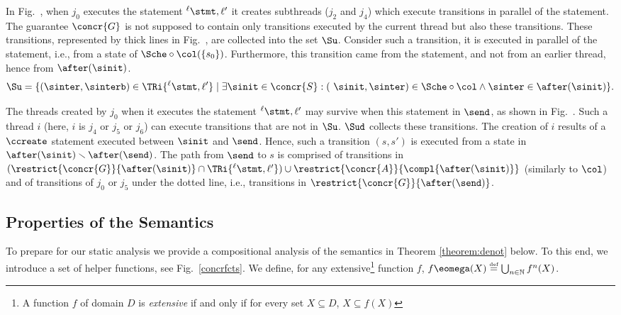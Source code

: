 \documentclass[12pt]{article}
\let\firstunion\cup
\let\firstinter\cap
\let\cup\firstunion
\let\cap\firstinter
\renewcommand{\subset}{\subseteq}
\newcommand{\egdef}{\stackrel{\text{\tiny def}}{=}}
\newcommand{\lab}{  {}^{\ell}}
\begin{document}
In Fig.~, when \(j_0\) executes the statement \(\lab \stmt,\ell'\) it creates subthreads (\(j_2\) and \(j_4\)) which execute transitions in parallel of the statement. The guarantee \(\concr{G}\) is not supposed to contain only transitions executed by the current thread but also these transitions. These transitions, represented by thick lines in Fig.~, are collected into the set \(\Su\).
Consider such a transition, it is executed in parallel of the statement, i.e., from a state of \(\Sche\circ\col(\{s_0\})\). Furthermore, this transition came from the statement, and not from an earlier thread, hence from \(\after(\sinit)\).
\[\Su = 
\{(\sinter,\sinterb)\in\TRi{\lab \stmt,\ell'}\mid \exists \sinit\in\concr{S} : ( \sinit,\sinter)\in \Sche\circ \col \wedge \sinter\in\after(\sinit) \}.
\]

The threads created by \(j_0\) when it executes the statement \(\lab \stmt,\ell'\) may survive when this statement \returns{} in \(\send\), as shown in Fig.~. Such a thread \(i\) (here, \(i\) is \(j_4\) or \(j_5\) or \(j_6\)) can execute transitions that are not in \(\Su\). \(\Sud\) collects these transitions. The creation of \(i\) results of a \(\ccreate\) statement executed between \(\sinit\) and \(\send\). Hence, such a transition \((s,s')\) is executed from a state in \(\after(\sinit)\smallsetminus\after(\send)\). The path from \(\send\) to \(s\) is comprised of transitions 
 in \((\restrict{\concr{G}}{\after(\sinit)}\cap\TRi{\lab \stmt,\ell'})\cup \restrict{\concr{A}}{\compl{\after(\sinit)}}\) (similarly to \(\col\)) and of transitions of \(j_0\) or \(j_5\) under the dotted line, i.e., transitions in \(\restrict{\concr{G}}{\after(\send)}\). 

\subsection{Properties of the \Cname Semantics }
 
 
\basicsemfuncs



To prepare for our static analysis we provide a compositional analysis of the \cname semantics in Theorem \ref{theorem:denot} below. To this end, we introduce a set of helper functions, see Fig.~\ref{concrfcts}. We define, for any extensive\footnote{A function \(f\) of domain \(D\) is \emph{extensive} if and only if for every set \(X\subset D\), \(X \subset f(X)\)} function \(f\), \(f\eomega(X)\egdef\bigcup_{n\in\mathbb{N}}f^n(X)\).
 
\end{document}
